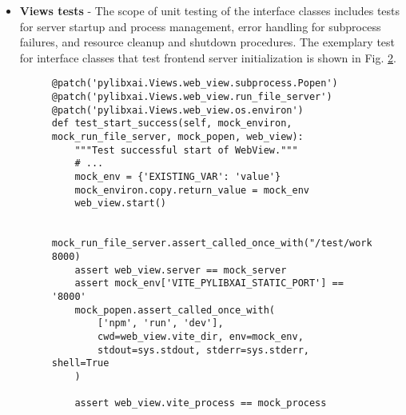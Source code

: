 \documentclass[
    bindingoffset=5mm,  %
    footnoteindent=3mm, %
    hyphenation=true    %
]{src/wut-thesis}
\begin{document}
\begin{itemize}
\begin{figure}[h]
\begin{verbatim}
def test_write_attribution_creates_json(self, context, temp_dir):
    """Test attribution JSON creation"""
    test_data = np.array([0.1, 0.2, 0.3, 0.4])
    suffix = "test_attribution.json"
    context.write_attribution(test_data, suffix)
    file_path = os.path.join(temp_dir, suffix)
    assert os.path.exists(file_path)
    with open(file_path, 'r') as f:
        data = json.load(f)
    
    assert "attributions" in data
    assert data["attributions"] == [0.1, 0.2, 0.3, 0.4]
\end{verbatim}
\caption{}
\label{fig:ContextUnitTest}
\end{figure}

    \item \textbf{Views tests} - The scope of unit testing of the interface classes includes tests for server
        startup and process management, error handling for subprocess failures, and resource cleanup and shutdown
        procedures. The exemplary test for interface classes that test frontend server initialization
        is shown in Fig. \ref{fig:ViewUnitTest}.

\begin{figure}[h]
\begin{verbatim}
@patch('pylibxai.Views.web_view.subprocess.Popen')
@patch('pylibxai.Views.web_view.run_file_server')
@patch('pylibxai.Views.web_view.os.environ')
def test_start_success(self, mock_environ, mock_run_file_server, mock_popen, web_view):
    """Test successful start of WebView."""
    # ...
    mock_env = {'EXISTING_VAR': 'value'}
    mock_environ.copy.return_value = mock_env
    web_view.start()
    
    mock_run_file_server.assert_called_once_with("/test/workdir", 8000)
    assert web_view.server == mock_server
    assert mock_env['VITE_PYLIBXAI_STATIC_PORT'] == '8000'
    mock_popen.assert_called_once_with(
        ['npm', 'run', 'dev'],
        cwd=web_view.vite_dir, env=mock_env,
        stdout=sys.stdout, stderr=sys.stderr, shell=True
    )
    
    assert web_view.vite_process == mock_process
\end{verbatim}
\caption{}
\label{fig:ViewUnitTest}
\end{figure}
\end{itemize}
\end{document}

